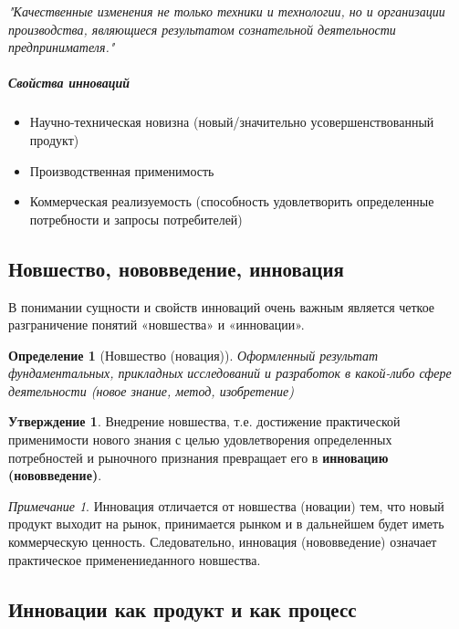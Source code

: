 \documentclass[11pt]{article}
\theoremstyle{plain} %
\newtheorem{proposition}[theorem]{Определение}
\theoremstyle{definition} %
\newtheorem{corollary}{Утверждение}[theorem]
\theoremstyle{remark} %
\newtheorem{nota}{Примечание}
\begin{document}
\begin{displayquote}
	\textit{"Качественные изменения не только техники и технологии, но и организации производства, являющиеся результатом   сознательной   деятельности предпринимателя."}
\end{displayquote}

\subparagraph{Свойства инноваций}

\begin{itemize}
	\item[1^{\circ}:] Научно-техническая новизна (новый/значительно усовершенствованный продукт)
	\item[2^{\circ}:] Производственная применимость
	\item[3^{\circ}:] Коммерческая реализуемость (способность удовлетворить определенные потребности и запросы потребителей)
\end{itemize}

\subsection{Новшество, нововведение, инновация}
В  понимании  сущности  и  свойств  инноваций  очень  важным  является четкое разграничение понятий «новшества» и «инновации».

\begin{proposition}[Новшество (новация)]
	Оформленный результат фундаментальных, прикладных исследований и разработок в какой-либо сфере деятельности (новое знание,   метод,   изобретение)
\end{proposition}

\begin{corollary}
	Внедрение  новшества,   т.е.   достижение практической   применимости   нового   знания   с   целью   удовлетворения определенных  потребностей  и  рыночного  признания  превращает  его  в \textbf{инновацию (нововведение)}.
\end{corollary}

\begin{nota}
	Инновация отличается от новшества (новации) тем, что новый продукт выходит на рынок, принимается рынком и в дальнейшем будет иметь коммерческую  ценность.  Следовательно,  инновация  (нововведение) означает практическое  применениеданного  новшества.
\end{nota}

\subsection{Инновации как продукт и как процесс}
\end{document}

